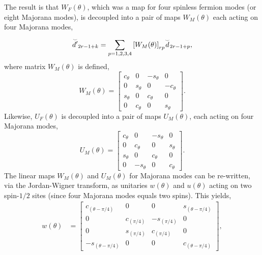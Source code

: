 \documentclass[aps,prl,twocolumn,showpacs,superscriptaddress,floatfix,10pt]{revtex4-1}
\begin{document}
The result is that ${W_F}(\theta )$, which was a map for four spinless fermion modes 
(or eight Majorana modes), is decoupled into a pair of maps ${W_M}\left( \theta  \right)$ 
each acting on four Majorana modes,
\begin{equation}
{{\overset{\lower0.5em\hbox{$\smash{\scriptscriptstyle\smile}$}}{d'} }_{2r - 1 + k}} = \sum\limits_{p = 1,2,3,4} {{{\left[ {{W_M}(\theta )} \right]}_{rp}}{{\overset{\lower0.5em\hbox{$\smash{\scriptscriptstyle\smile}$}}{d} }_{2r - 1 + p}}}, \label{eq:B9}
\end{equation}
where matrix ${W_M}\left( \theta  \right)$ is defined,
\begin{equation}
{W_M}\left( \theta  \right) = \left[ {\begin{array}{*{20}{c}}
  {{c_\theta }}&0&{ - {s_\theta }}&0 \\ 
  0&{{s_\theta }}&0&{ - {c_\theta }} \\ 
  {{s_\theta }}&0&{{c_\theta }}&0 \\ 
  0&{{c_\theta }}&0&{{s_\theta }} 
\end{array}} \right]. \label{eq:B10}
\end{equation}
Likewise, ${U_F}(\theta )$ is decoupled into a pair of maps ${U_M}\left( \theta  \right)$, 
each acting on four Majorana modes,
\begin{equation}
{U_M}(\theta ) = \left[ {\begin{array}{*{20}{c}}
  {{c_\theta }}&0&{ - {s_\theta }}&0 \\ 
  0&{{c_\theta }}&0&{{s_\theta }} \\ 
  {{s_\theta }}&0&{{c_\theta }}&0 \\ 
  0&{ - {s_\theta }}&0&{{c_\theta }} 
\end{array}} \right]. \label{eq:B11}
\end{equation}
The linear maps ${W_M}(\theta )$ and ${U_M}(\theta )$ for 
Majorana modes can be re-written, 
via the Jordan-Wigner transform, as 
unitaries $w(\theta )$ and $u(\theta )$ acting on two spin-$1/2$ sites 
(since four Majorana modes equals two spins). This yields,
\begin{align}
w(\theta ) & = \left[ {\begin{array}{*{20}{c}}
  {{c_{(\theta  - \pi /4)}}}&0&0&{{s_{(\theta  - \pi /4)}}} \\ 
  0&{{c_{(\pi /4)}}}&{ - {s_{(\pi /4)}}}&0 \\ 
  0&{{s_{(\pi /4)}}}&{{c_{(\pi /4)}}}&0 \\ 
  { - {s_{(\theta  - \pi /4)}}}&0&0&{{c_{(\theta  - \pi /4)}}} 
\end{array}} \right], \label{eq:B12}
\end{align}
\end{document}

